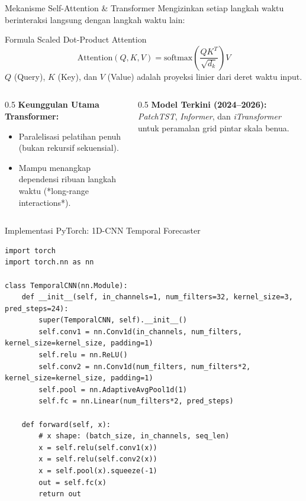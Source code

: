 \documentclass[aspectratio=169, 10pt]{beamer}
\begin{document}
\begin{frame}{Mekanisme Self-Attention \& Transformer}
    Mengizinkan setiap langkah waktu berinteraksi langsung dengan langkah waktu lain:
    \begin{block}{Formula Scaled Dot-Product Attention}
        \begin{equation}
            \text{Attention}(Q, K, V) = \text{softmax}\left( \frac{QK^T}{\sqrt{d_k}} \right) V
        \end{equation}
        $Q$ (Query), $K$ (Key), dan $V$ (Value) adalah proyeksi linier dari deret waktu input.
    \end{block}
    \begin{columns}[T]
        \begin{column}{0.5\textwidth}
            \textbf{Keunggulan Utama Transformer:}
            \begin{itemize}
                \item Paralelisasi pelatihan penuh (bukan rekursif sekuensial).
                \item Mampu menangkap dependensi ribuan langkah waktu (*long-range interactions*).
            \end{itemize}
        \end{column}
        \begin{column}{0.5\textwidth}
            \textbf{Model Terkini (2024--2026):}
            \textit{PatchTST}, \textit{Informer}, dan \textit{iTransformer} untuk peramalan grid pintar skala benua.
        \end{column}
    \end{columns}
\end{frame}

\begin{frame}[fragile]{Implementasi PyTorch: 1D-CNN Temporal Forecaster}
\begin{lstlisting}
import torch
import torch.nn as nn

class TemporalCNN(nn.Module):
    def __init__(self, in_channels=1, num_filters=32, kernel_size=3, pred_steps=24):
        super(TemporalCNN, self).__init__()
        self.conv1 = nn.Conv1d(in_channels, num_filters, kernel_size=kernel_size, padding=1)
        self.relu = nn.ReLU()
        self.conv2 = nn.Conv1d(num_filters, num_filters*2, kernel_size=kernel_size, padding=1)
        self.pool = nn.AdaptiveAvgPool1d(1)
        self.fc = nn.Linear(num_filters*2, pred_steps)

    def forward(self, x):
        # x shape: (batch_size, in_channels, seq_len)
        x = self.relu(self.conv1(x))
        x = self.relu(self.conv2(x))
        x = self.pool(x).squeeze(-1)
        out = self.fc(x)
        return out
\end{lstlisting}
\end{frame}
\end{document}
